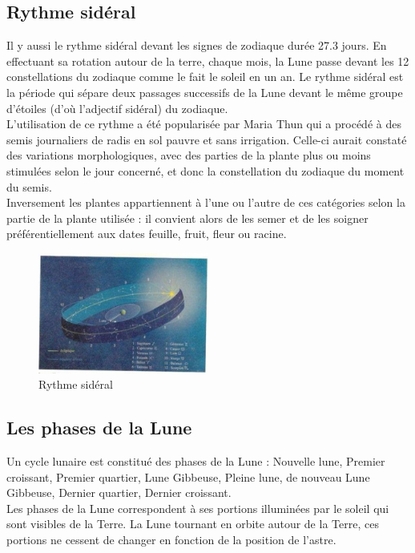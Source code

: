 \subsection{Rythme sidéral}
Il y aussi le rythme sidéral devant les signes de zodiaque durée 27.3 jours. En effectuant sa rotation autour de la terre, chaque mois, la Lune passe devant les 12 constellations du zodiaque comme le fait le soleil en un an. Le rythme sidéral est la période qui sépare deux passages successifs de la Lune devant le même groupe d'étoiles (d'où l'adjectif sidéral) du zodiaque.\\
L'utilisation de ce rythme a été popularisée par Maria Thun qui a procédé à des semis journaliers de radis en sol pauvre et sans irrigation. Celle-ci aurait constaté des variations morphologiques, avec des parties de la plante plus ou moins stimulées selon le jour concerné, et donc la constellation du zodiaque du moment du semis.\\
Inversement les plantes appartiennent à l'une ou l'autre de ces catégories selon la partie de la plante utilisée : il convient alors de les semer et de les soigner préférentiellement aux dates feuille, fruit, fleur ou racine.
\\
\begin{figure}[!h]
    	\center
    		\includegraphics[width=0.5\textwidth]{image/sideral}
   		\caption{Rythme sidéral}
    	\label{Rythme sidéral}
	\end{figure}
\subsection{Les phases de la Lune}
Un cycle lunaire est constitué des phases de la Lune : Nouvelle lune, Premier croissant, Premier quartier, Lune Gibbeuse, Pleine lune, de nouveau Lune Gibbeuse, Dernier quartier, Dernier croissant.\\

Les phases de la Lune correspondent à ses portions illuminées par le soleil qui sont visibles de la Terre. La Lune tournant en orbite autour de la Terre, ces portions ne cessent de changer en fonction de la position de l'astre.\\

